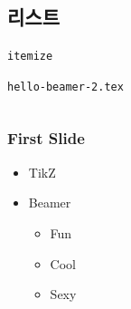 \documentclass[compress]{beamer}
\begin{document}
\subsection{리스트}
\begin{frame}[fragile=singleslide]{\texttt{itemize}}
  \begin{block}{\texttt{hello-beamer-2.tex}}
    \begin{columns}
      \begin{column}{0.5\textwidth}
        \begin{latexcode}
          \begin{frame}
            \frametitle{First Slide}
            \begin{itemize}
              \item TikZ
              \item Beamer
                \begin{itemize}
                  \item Fun
                  \item Cool
                  \item Sexy
                \end{itemize}
            \end{itemize}
          \end{frame}
        \end{latexcode}
      \end{column}
    \end{columns}
  \end{block}
\end{frame}
\end{document}
